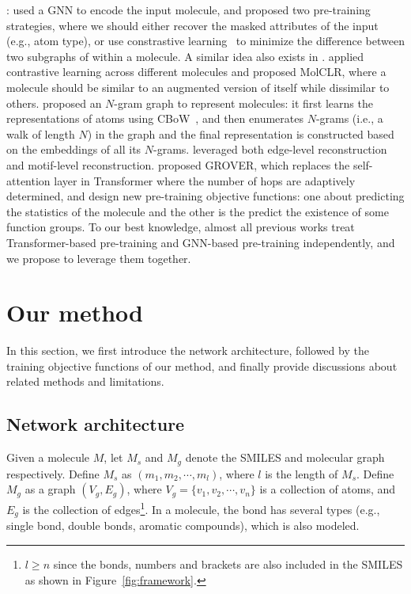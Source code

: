 \documentclass{article}
\begin{document}
: \citet{hu2019strategies} used a GNN to encode the input molecule, and proposed two pre-training strategies, where we should either recover the masked attributes of the input (e.g., atom type), or use constrastive learning~\cite{1640964,chen2020simple} to minimize the difference between two subgraphs of within a molecule. A similar idea also exists in \citet{li2020learn}. \citet{wang2021molclr} applied contrastive learning across different molecules and proposed MolCLR, where a molecule should be similar to an augmented version of itself while dissimilar to others. \citet{liu2019ngram} proposed an $N$-gram graph to represent molecules: it first learns the representations of atoms using CBoW~\cite{mikolov2013efficient}, and then enumerates $N$-grams (i.e., a walk of length $N$) in the graph and the final representation is constructed based on the embeddings of all its $N$-grams. \citet{shen2020molgnn} leveraged both edge-level reconstruction and motif-level reconstruction. \citet{rong2020self} proposed GROVER, which replaces the self-attention layer in Transformer where the number of hops are adaptively determined, and design new pre-training objective functions: one about predicting the statistics of the molecule and the other is the predict the existence of some function groups. To our best knowledge, almost all previous works treat Transformer-based pre-training and GNN-based pre-training independently, and we propose to leverage them together.

\section{Our method}
In this section, we first introduce the network architecture, followed by the training objective functions of our method, and finally provide discussions about related methods and limitations.

\subsection{Network architecture}
Given a molecule $M$, let $M_s$ and $M_g$ denote the SMILES and molecular graph respectively. Define $M_s$ as $(m_1,m_2,\cdots,m_l)$, where $l$ is the length of $M_s$.
Define $M_g$ as a graph $(V_g, E_g)$, where $V_g=\{v_1,v_2,\cdots,v_n\}$ is a collection of atoms, and $E_g$ is the collection of edges\footnote{$l\geq n$ since the bonds, numbers and brackets are also included in the SMILES as shown in Figure~\ref{fig:framework}.}. In a molecule, the bond has several types (e.g., single bond, double bonds, aromatic compounds), which is also modeled. 
\end{document}
